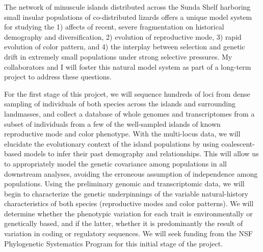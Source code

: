 The network of minuscule islands distributed across the Sunda Shelf harboring
small insular populations of co-distributed lizards offers a unique model
system for studying the 
1) affects of recent, severe fragmentation on historical demography and
diversification,
2) evolution of reproductive mode,
3) rapid evolution of color pattern, and 
4) the interplay between selection and genetic drift in extremely small
populations under strong selective pressures.
My collaborators and I will foster this natural model system as part of a
long-term project to address these questions.

For the first stage of this projcet, we will sequence hundreds of loci from
dense sampling of individuals of both species across the islands and
surrounding landmasses, and collect a database of whole genomes and
transcriptomes from a subset of individuals from a few of the well-sampled
islands of known reproductive mode and color phenotype.
With the multi-locus data, we will elucidate the evolutionary context of the
island populations by using coalescent-based models to infer their past
demography and relationships.
This will allow us to appropriately model the genetic covariance among
populations in all downstream analyses, avoiding the erroneous assumption of
independence among populations.
Using the preliminary genomic and transcriptomic data, we will begin to
characterize the genetic underpinnings of the variable natural-history
characteristics of both species (reproductive modes and color patterns).
We will determine whether the phenotypic variation for each trait is
environmentally or genetically based, and if the latter, whether it is
predominantly the result of variation in coding or regulatory sequences.
We will seek funding from the NSF Phylogenetic Systematics Program for this
initial stage of the project.

